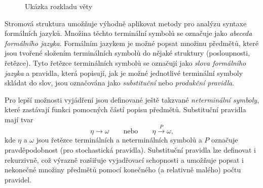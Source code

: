 \begin{figure}[H]
	\caption{Ukázka rozkladu věty}\label{fig:example_car_fix}
\end{figure}


Stromová struktura umožňuje výhodně aplikovat metody pro analýzu syntaxe formálních jazyků.
Množina těchto terminální symbolů se označuje jako \emph{abeceda formálního jazyka}.
Formálním jazykem je možné popsat množinu předmětů, které jsou tvořené složením terminálních symbolů do nějaké struktury (posloupnosti, řetězce).
Tyto řetězce terminálních symbolů se označují jako \emph{slova formálního jazyka} a pravidla,
která popisují, jak je možné jednotlivé terminální symboly skládat do slov, jsou označována jako \emph{substituční} nebo \emph{produkční pravidla}.~\cite{PsutkaJ_2006_Mluvimes}


Pro lepší možnosti vyjádření jsou definované ještě takzvané \emph{neterminální symboly}, které zastávají funkci pomocných částí popisu předmětů.
Substituční pravidla mají tvar
\[
	\eta \to \omega \qquad \text{nebo} \qquad \eta \xrightarrow{P} \omega,
\]
kde $\eta$ a $\omega$ jsou řetězce terminálních a neterminálních symbolů a $P$ označuje pravděpodobnost (pro stochastická pravidla).
Substituční pravidla lze definovat i rekurzivně, což výrazně rozšiřuje vyjadřovací schopnosti a umožňuje popsat i nekonečné množiny předmětů
pomocí konečného (a relativně malého) počtu pravidel.~\cite{PsutkaJ_2006_Mluvimes}


